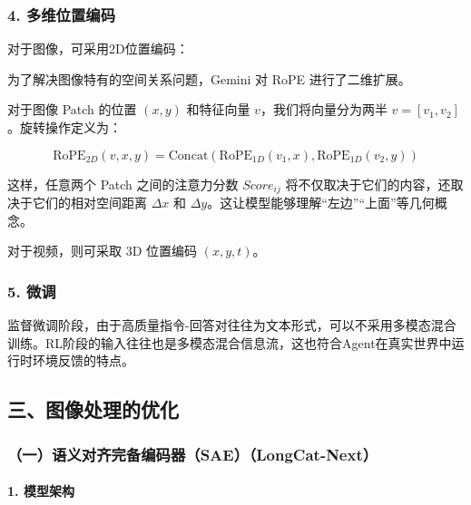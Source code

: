 \hypertarget{ux591aux7ef4ux4f4dux7f6eux7f16ux7801}{%
\subsubsection{4. 多维位置编码}\label{ux591aux7ef4ux4f4dux7f6eux7f16ux7801}}

对于图像，可采用2D位置编码：

为了解决图像特有的空间关系问题，Gemini 对 RoPE 进行了二维扩展。

对于图像 Patch 的位置 \((x,y)\) 和特征向量 \(v\)，我们将向量分为两半 \(v=[v_1,v_2]\)。旋转操作定义为：

\[
\mathrm{RoPE}_{2D}(v,x,y)=\mathrm{Concat}(\mathrm{RoPE}_{1D}(v_1,x),\mathrm{RoPE}_{1D}(v_2,y))
\]

这样，任意两个 Patch 之间的注意力分数 \(Score_{ij}\) 将不仅取决于它们的内容，还取决于它们的相对空间距离 \(\Delta x\) 和 \(\Delta y\)。这让模型能够理解``左边''``上面''等几何概念。

对于视频，则可采取 3D 位置编码 \((x,y,t)\)。

\hypertarget{ux5faeux8c03}{%
\subsubsection{5. 微调}\label{ux5faeux8c03}}

监督微调阶段，由于高质量指令-回答对往往为文本形式，可以不采用多模态混合训练。RL阶段的输入往往也是多模态混合信息流，这也符合Agent在真实世界中运行时环境反馈的特点。

\hypertarget{ux4e09ux56feux50cfux5904ux7406ux7684ux4f18ux5316}{%
\subsection{三、图像处理的优化}\label{ux4e09ux56feux50cfux5904ux7406ux7684ux4f18ux5316}}

\hypertarget{ux4e00ux8bedux4e49ux5bf9ux9f50ux5b8cux5907ux7f16ux7801ux5668saelongcat-next}{%
\subsubsection{（一）语义对齐完备编码器（SAE）（LongCat-Next）}\label{ux4e00ux8bedux4e49ux5bf9ux9f50ux5b8cux5907ux7f16ux7801ux5668saelongcat-next}}

\hypertarget{ux6a21ux578bux67b6ux6784}{%
\paragraph{1. 模型架构}\label{ux6a21ux578bux67b6ux6784}}


